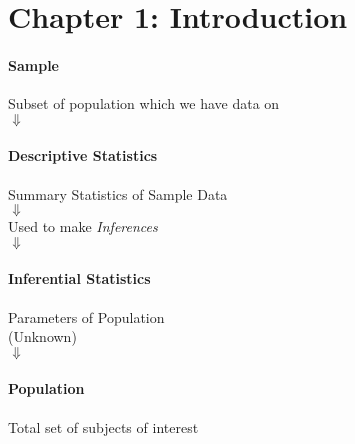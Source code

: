 \section{Chapter 1: Introduction}
\centering
\paragraph{Sample}
Subset of population which we have data on\\
$\Downarrow$
\paragraph{Descriptive Statistics} 
Summary Statistics of Sample Data\\
$\Downarrow$\\
Used to make \textsl{Inferences}\\
$\Downarrow$
\paragraph{Inferential Statistics}
Parameters of Population\\
(Unknown)\\
$\Downarrow$
\paragraph{Population} 
Total set of subjects of interest\\